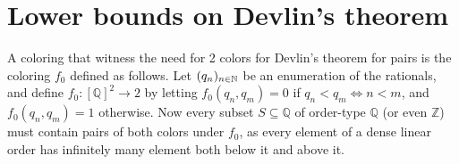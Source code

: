 \section{Lower bounds on Devlin's theorem}\label{sect:lower-bound-devlin}

A coloring that witness the need for 2 colors for Devlin's theorem for pairs is the coloring $f_0$ defined as follows. Let $(q_n)_{n\in\mathbb{N}}$ be an enumeration of the rationals, and define $f_0: [\mathbb Q]^2\to 2$ by letting $f_0(q_n, q_m) = 0$ if $q_n<q_m\iff n<m$, and $f_0(q_n, q_m) = 1$ otherwise. Now every subset $S\subseteq\mathbb Q$ of order-type $\mathbb Q$ (or even $\mathbb Z$) must contain pairs of both colors under $f_0$, as every element of a dense linear order has infinitely many element both below it and above it.

\begin{comment}

\begin{theorem}
  $\DT2{<\infty,4}$ implies $\mathrm{ER}^2$.
\end{theorem}
\begin{proof}

  \newcommand\ER{\mathrm{ER}}
  \newcommand\femb{f_{<_\Qb}}
  First, suppose that $\ACA_0$ is true. In this case, $\ER^2$ is true, as $\ACA_0$ implies $\DT2{<\infty, 2}$ by \Cref{thm:strong-devlin-one-type}, which itself implies $\mathrm{ER}^2$ by \Cref{th:dt242-implies-er2}. If $\ACA_0$ does not hold, there exists $X$ such that $\forall Y$, $Y\neq X'$, in other words the jump of $x$ does not exists. Fix such an $X$.

  Let $f:[\cantor]\to2$ be an instance of $\ER^2$, where $(\cantor,\ltlex)$ can be taken as $\Qb$ as it is computably isomorphic to it. Define $i_\infty=0$ and $i_\Qb=1$, so that the goal is to find either an infinite set homogeneous for color $i_\infty$, or a set of order-type $\Qb$ homogeneous for color $i_\Qb$. The coloring on which we apply Devlin's Theorem is the product of three colorings. The first one is the instance of $\ER^2$, the second and third are the witness of $\DT2{<\infty,3}$ implies $\ACA_0$ as defined in \Cref{th:lower-bound-devlin}: $f_J$ relativized to $X$, and $\femb$.


\end{comment}
